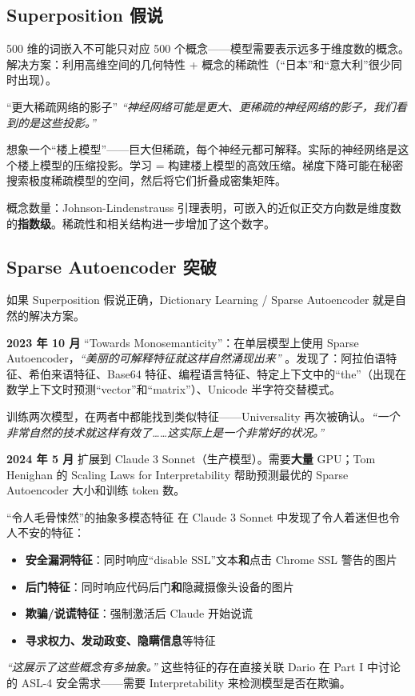 \subsection{Superposition 假说}

500 维的词嵌入不可能只对应 500 个概念——模型需要表示远多于维度数的概念。解决方案：利用高维空间的几何特性 + 概念的稀疏性（``日本''和``意大利''很少同时出现）。

\begin{importantbox}{``更大稀疏网络的影子''}
\textit{``神经网络可能是更大、更稀疏的神经网络的影子，我们看到的是这些投影。''}

想象一个``楼上模型''——巨大但稀疏，每个神经元都可解释。实际的神经网络是这个楼上模型的压缩投影。学习 = 构建楼上模型的高效压缩。梯度下降可能在秘密搜索极度稀疏模型的空间，然后将它们折叠成密集矩阵。

概念数量：Johnson-Lindenstrauss 引理表明，可嵌入的近似正交方向数是维度数的\textbf{指数级}。稀疏性和相关结构进一步增加了这个数字。
\end{importantbox}

\subsection{Sparse Autoencoder 突破}

如果 Superposition 假说正确，Dictionary Learning / Sparse Autoencoder 就是自然的解决方案。

\textbf{2023 年 10 月} ``Towards Monosemanticity''：在单层模型上使用 Sparse Autoencoder，\textit{``美丽的可解释特征就这样自然涌现出来''} 。发现了：阿拉伯语特征、希伯来语特征、Base64 特征、编程语言特征、特定上下文中的``the''（出现在数学上下文时预测``vector''和``matrix''）、Unicode 半字符交替模式。

训练两次模型，在两者中都能找到类似特征——Universality 再次被确认。\textit{``一个非常自然的技术就这样有效了……这实际上是一个非常好的状况。''}

\textbf{2024 年 5 月} 扩展到 Claude 3 Sonnet（生产模型）。需要\textbf{大量} GPU；Tom Henighan 的 Scaling Laws for Interpretability 帮助预测最优的 Sparse Autoencoder 大小和训练 token 数。

\begin{warningbox}{``令人毛骨悚然''的抽象多模态特征}
在 Claude 3 Sonnet 中发现了令人着迷但也令人不安的特征：

\begin{itemize}
    \item \textbf{安全漏洞特征}：同时响应``disable SSL''文本\textbf{和}点击 Chrome SSL 警告的图片
    \item \textbf{后门特征}：同时响应代码后门\textbf{和}隐藏摄像头设备的图片
    \item \textbf{欺骗/说谎特征}：强制激活后 Claude 开始说谎
    \item \textbf{寻求权力、发动政变、隐瞒信息}等特征
\end{itemize}

\textit{``这展示了这些概念有多抽象。''} 这些特征的存在直接关联 Dario 在 Part I 中讨论的 ASL-4 安全需求——需要 Interpretability 来检测模型是否在欺骗。
\end{warningbox}

